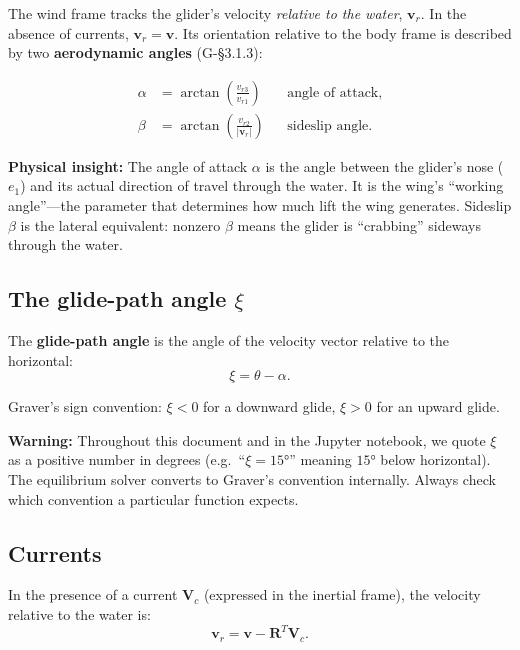 \documentclass[11pt,a4paper]{article}
\newcommand{\vect}[1]{\bm{#1}}
\newcommand{\mat}[1]{\mathbf{#1}}
\newcommand{\insight}[1]{\par\smallskip\noindent\colorbox{green!8}{\parbox{\dimexpr\linewidth-2\fboxsep}{%
  \small\textbf{Physical insight:} #1}}\smallskip}
\newcommand{\warning}[1]{\par\smallskip\noindent\colorbox{red!8}{\parbox{\dimexpr\linewidth-2\fboxsep}{%
  \small\textbf{Warning:} #1}}\smallskip}
\begin{document}
The wind frame tracks the glider's velocity \emph{relative to the water},
$\vect{v}_r$.  In the absence of currents, $\vect{v}_r = \vect{v}$.
Its orientation relative to the body frame is described by two
\textbf{aerodynamic angles} (G-\S3.1.3):

\begin{align}
  \alpha &= \arctan\!\left(\frac{v_{r3}}{v_{r1}}\right)
    &&\text{angle of attack}, \label{eq:aoa} \\
  \beta  &= \arctan\!\left(\frac{v_{r2}}{|\vect{v}_r|}\right)
    &&\text{sideslip angle}. \label{eq:sideslip}
\end{align}

\insight{The angle of attack $\alpha$ is the angle between the glider's nose ($e_1$)
and its actual direction of travel through the water.  It is the wing's ``working angle''---the
parameter that determines how much lift the wing generates.  Sideslip $\beta$ is the
lateral equivalent: nonzero $\beta$ means the glider is ``crabbing'' sideways through the water.}

\subsection{The glide-path angle $\xi$}
\label{sec:xi}

The \textbf{glide-path angle} is the angle of the velocity vector relative to the
horizontal:
\begin{equation}
  \xi = \theta - \alpha.
  \label{eq:xi}
\end{equation}

Graver's sign convention: $\xi < 0$ for a downward glide, $\xi > 0$ for an upward glide.

\warning{Throughout this document and in the Jupyter notebook, we quote $\xi$ as a
positive number in degrees (e.g.\ ``$\xi=15°$'' meaning $15°$ below horizontal).
The equilibrium solver converts to Graver's convention internally.  Always check which
convention a particular function expects.}

\subsection{Currents}

In the presence of a current $\vect{V}_c$ (expressed in the inertial frame), the
velocity relative to the water is:
\begin{equation}
  \vect{v}_r = \vect{v} - \mat{R}^T \vect{V}_c.
  \label{eq:vr}
\end{equation}
\end{document}
